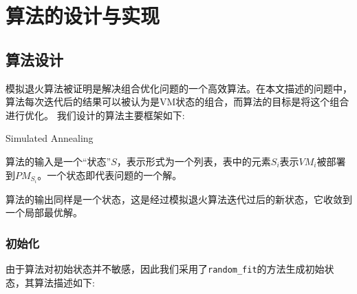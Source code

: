 
\chapter{算法的设计与实现}
\label{chap:algo}

\section{算法设计}
\label{sec:design}
模拟退火算法被证明是解决组合优化问题的一个高效算法。在本文描述的问题中，算法每次迭代后的结果可以被认为是VM状态的组合，而算法的目标是将这个组合进行优化。
我们设计的算法主要框架如下:

\begin{algorithm}[H]
  \DontPrintSemicolon
  
  \caption{Simulated Annealing\label{algo:SA}}
\end{algorithm}

算法的输入是一个``状态''$S$，表示形式为一个列表，表中的元素$S_i$表示$VM_i$被部署到$PM_{S_i}$。一个状态即代表问题的一个解。

算法的输出同样是一个状态，这是经过模拟退火算法迭代过后的新状态，它收敛到一个局部最优解。

\subsection{初始化}
\label{sec:init}

由于算法对初始状态并不敏感，因此我们采用了\texttt{random\_fit}的方法生成初始状态，其算法描述如下:

